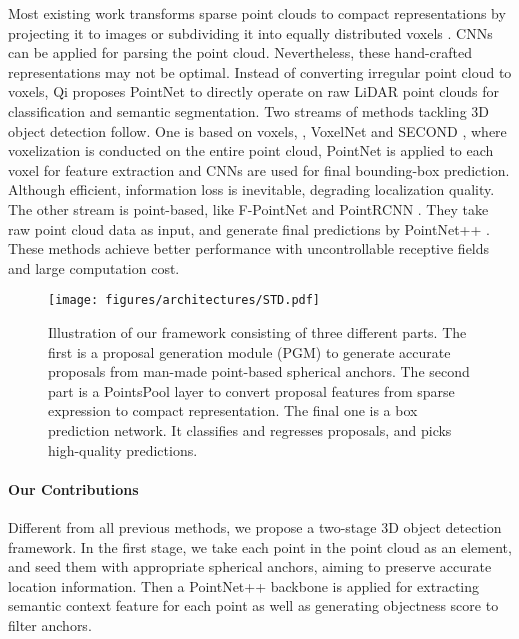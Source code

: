 \documentclass[10pt,twocolumn,letterpaper]{article}
\begin{document}
Most existing work transforms sparse point clouds to compact representations by projecting it to images \cite{MV3D,AVOD,MultiViewRandomForest,PedestrianDetectionCombine,Vote3Deep} or subdividing it into equally distributed voxels \cite{VoxNet,VotetoVote,VOXELNET,YangLU18}. CNNs can be applied for parsing the point cloud. Nevertheless, these hand-crafted representations may not be optimal. Instead of converting irregular point cloud to voxels, Qi \etal proposes PointNet \cite{POINTNET,POINTNET2} to directly operate on raw LiDAR point clouds for classification and semantic segmentation. Two streams of methods tackling 3D object detection follow. One is based on voxels, \eg, VoxelNet \cite{VOXELNET} and SECOND \cite{yan2018second}, where voxelization is conducted on the entire point cloud, PointNet is applied to each voxel for feature extraction and CNNs are used for final bounding-box prediction. Although efficient, information loss is inevitable, degrading localization quality. The other stream is point-based, like F-PointNet \cite{FPOINTNET} and PointRCNN \cite{shi2018pointrcnn}. They take raw point cloud data as input, and generate final predictions by PointNet++ \cite{POINTNET2}. These methods achieve better performance with uncontrollable receptive fields and large computation cost.


\begin{figure*}[t]
	\centering
	\texttt{[image: figures/architectures/STD.pdf]}\\
	\caption{Illustration of our framework consisting of three different parts. The first is a proposal generation module (PGM) to generate  accurate proposals from man-made point-based spherical anchors. The second part is a PointsPool layer to convert proposal features from sparse expression to compact representation. The final one is a box prediction network. It classifies and regresses proposals, and picks high-quality predictions.}
	\label{fig:framework}\vspace{-0.1in}
\end{figure*}

\vspace{-0.1in}
\paragraph{Our Contributions}
Different from all previous methods, we propose a two-stage 3D object detection framework. In the first stage, we take each point in the point cloud as an element, and seed them with appropriate spherical anchors, aiming to preserve accurate location information. Then a PointNet++ backbone is applied for extracting semantic context feature for each point as well as generating objectness score to filter anchors. 
\end{document}
